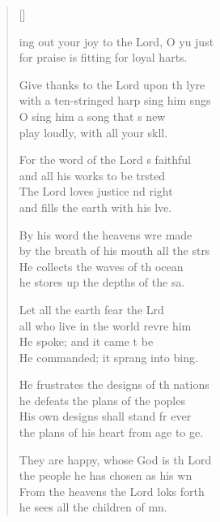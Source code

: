 \settowidth{\versewidth}{Ring out your joy to the Lord, O you just}
\begin{verse}[\versewidth]
  \begin{patverse}
    ing out your joy to the Lord, O yu just\\
    for praise is fitting for loyal harts.

Give thanks to the Lord upon th lyre\\
    with a ten-stringed harp sing him sngs\\
O sing him a song that \pointup{\i}s new\\
    play loudly, with all your sk\pointup{\i}ll.

For the word of the Lord \pointup{\i}s faithful\\
    and all his works to be trsted\\
The Lord loves justice nd right\\
    and fills the earth with his lve.

By his word the heavens wre made\\
    by the breath of his mouth all the strs\\
He collects the waves of th ocean\\
    he stores up the depths of the sa.

Let all the earth fear the Lrd\\
    all who live in the world revre him\\
He spoke; and it came t be\\
    He commanded; it sprang into bing.

He frustrates the designs of th nations\\
    he defeats the plans of the poples\\
His own designs shall stand fr ever\\
    the plans of his heart from age to ge.

They are happy, whose God is th Lord\\
    the people he has chosen as his wn\\
From the heavens the Lord loks forth\\
    he sees all the children of mn.


\end{patverse}
\end{verse}
